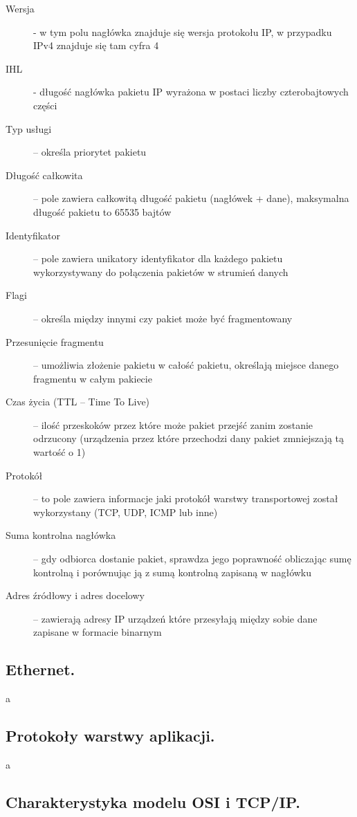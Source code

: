 \documentclass[a4paper,12pt,oneside]{book}
\begin{document}
				\begin{description}
					\item[Wersja] - w tym polu nagłówka znajduje się wersja protokołu IP, w przypadku IPv4 znajduje się tam cyfra 4
					\item[IHL] - długość nagłówka pakietu IP wyrażona w postaci liczby czterobajtowych części
					\item[Typ usługi] – określa priorytet pakietu
					\item[Długość całkowita] – pole zawiera całkowitą długość pakietu (nagłówek + dane), maksymalna długość pakietu to 65535 bajtów
					\item[Identyfikator ]  – pole zawiera unikatory identyfikator dla każdego pakietu wykorzystywany do połączenia pakietów w strumień danych
					\item[Flagi] – określa między innymi czy pakiet może być fragmentowany
					\item[Przesunięcie fragmentu] – umożliwia złożenie pakietu w całość pakietu, określają miejsce danego fragmentu w całym pakiecie
					\item[Czas życia (TTL – Time To Live)] – ilość przeskoków przez które może pakiet przejść zanim zostanie odrzucony (urządzenia przez które przechodzi dany pakiet zmniejszają tą wartość o 1)
					\item[Protokół ] – to pole zawiera informacje jaki protokół warstwy transportowej został wykorzystany (TCP, UDP, ICMP lub inne)
					\item[Suma kontrolna nagłówka] – gdy odbiorca dostanie pakiet, sprawdza jego poprawność obliczając sumę kontrolną i porównując ją z sumą kontrolną zapisaną w nagłówku
					\item[Adres źródłowy i adres docelowy ] – zawierają adresy IP urządzeń które przesyłają między sobie dane zapisane w formacie binarnym
				\end{description}
			\newpage\subsection{\color{red}Ethernet.}
				a
			\newpage\subsection{\color{red}Protokoły warstwy aplikacji.}
				a
			\newpage\subsection{Charakterystyka modelu OSI i TCP/IP.}
\end{document}
